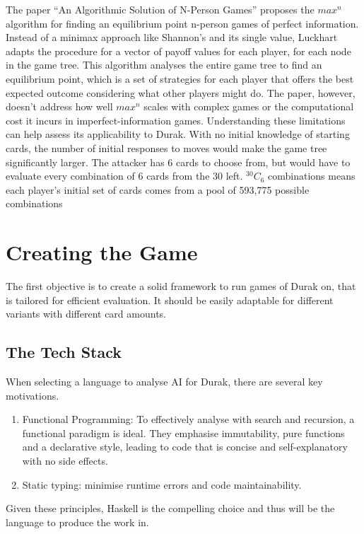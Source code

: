 \documentclass[a4paper, twoside, 12pt]{report}
\begin{document}
The paper ``An Algorithmic Solution of N-Person Games'' proposes the \(max^n\) algorithm for finding an equilibrium point n-person games of perfect information\cite{luckhart}. Instead of a minimax approach like Shannon's and its single value, Luckhart adapts the procedure for a vector of payoff values for each player, for each node in the game tree. This algorithm analyses the entire game tree to find an equilibrium point, which is a set of strategies for each player that offers the best expected outcome considering what other players might do. The paper, however, doesn't address how well \(max^n\) scales with complex games or the computational cost it incurs in imperfect-information games. Understanding these limitations can help assess its applicability to Durak. With no initial knowledge of starting cards, the number of initial responses to moves would make the game tree significantly larger. The attacker has 6 cards to choose from, but would have to evaluate every combination of 6 cards from the 30 left. \(^30 C_6\) combinations means each player's initial set of cards comes from a pool of 593,775 possible combinations

\chapter{Creating the Game}

The first objective is to create a solid framework to run games of Durak on, that is tailored for efficient evaluation. It should be easily adaptable for different variants with different card amounts.

\section{The Tech Stack}

When selecting a language to analyse AI for Durak, there are several key motivations.

\begin{enumerate}
	\item Functional Programming: To effectively analyse with search and recursion, a functional paradigm is ideal. They emphasise immutability, pure functions and a declarative style, leading to code that is concise and self-explanatory with no side effects.
	\item Static typing: minimise runtime errors and code maintainability.
\end{enumerate}

Given these principles, Haskell is the compelling choice and thus will be the language to produce the work in.
\end{document}
